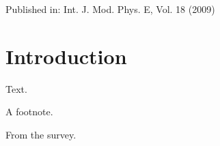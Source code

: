 \documentclass{ws-ijmpe}
\begin{document}
\title{}
\author{}
\address{Somewhere University}
\maketitle
\begin{otherinfo}Published in: Int. J. Mod. Phys. E, Vol. 18 (2009)\end{otherinfo}
\begin{abstract}An abstract.\end{abstract}
\section{Introduction}
Text.
\begin{table}[h]
\begin{tabfootnote} A footnote.\end{tabfootnote}
\begin{tabnote}[Source]From the survey.\end{tabnote}
\end{table}
\end{document}
